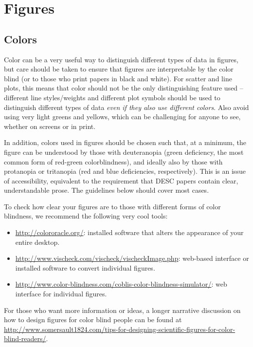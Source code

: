 \documentclass[letterpaper,11pt]{article}
\begin{document}
\section{Figures}

\subsection{Colors} \label{sec:figcolor}

Color can be a very useful way to distinguish different types of data in figures, but care should be taken to ensure that figures are interpretable by the color blind (or to those who print papers in black and white). For scatter and line plots, this means that color should not be the only distinguishing feature used -- different line styles/weights and different plot symbols should be used to distinguish different types of data \emph{even if they also use different colors}. Also avoid using very light greens and yellows, which can be challenging for anyone to see, whether on screens or in print.

In addition, colors used in figures should be chosen such that, at a minimum, the figure can be understood by those with deuteranopia (green deficiency, the most common form of red-green colorblindness), and ideally also by those with protanopia or tritanopia (red and blue deficiencies, respectively). This is an issue of accessibility, equivalent to the requirement that DESC papers contain clear, understandable prose. The guidelines below should cover most cases.

To check how clear your figures are to those with different forms of color blindness, we recommend the following very cool tools:
\begin{itemize}
\item \url{http://colororacle.org/}: installed software that alters the appearance of your entire desktop.
\item \url{http://www.vischeck.com/vischeck/vischeckImage.php}: web-based interface or installed software to convert individual figures.
\item \url{http://www.color-blindness.com/coblis-color-blindness-simulator/}: web interface for individual figures.
\end{itemize}

For those who want more information or ideas, a longer narrative discussion on how to design figures for color blind people can be found at \\ \url{http://www.somersault1824.com/tips-for-designing-scientific-figures-for-color-blind-readers/}.
\end{document}
